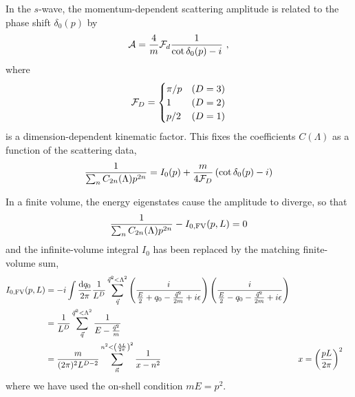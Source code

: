 In the $s$-wave, the momentum-dependent scattering amplitude is related to the phase shift $\delta_0(p)$ by
\begin{equation}
    \mathcal{A} = \frac{4}{m}\mathcal{F}_d\frac{1}{\cot \delta_0(p)-i}\ ,
\end{equation}
where
\begin{equation}
    \mathcal{F}_D
    =
    \begin{cases}
        \pi/p   & (D=3)\\
        1       & (D=2)\\
        p/2     & (D=1)
\end{cases}
\end{equation}
is a dimension-dependent kinematic factor.
This fixes the coefficients $C(\Lambda)$ as a function of the scattering data,
\begin{equation}
    \frac{1}{\sum_n C_{2n}(\Lambda) p^{2n}}
    =
    I_0(p) + \frac{m}{4 \mathcal{F}_D}\left(\cot \delta_0(p) - i\right)
\end{equation}

In a finite volume, the energy eigenstates cause the amplitude to diverge, so that
\begin{equation}
    \frac{1}{\sum_n C_{2n}(\Lambda) p^{2n}} - I_{0,\textrm{FV}}(p,L) = 0
\end{equation}
and the infinite-volume integral $I_0$ has been replaced by the matching finite-volume sum,
\begin{align}
I_{0,\textrm{FV}}(p,L)
    &=-i\int \frac { \mathrm {d}q_0}{2\pi} \frac{1}{L^D}\sum_{\vec{q}}^{\vec{q}^2 < \Lambda^2} \left( \frac { i } { \frac{E}{2} + q _ { 0 } - \frac{\vec{q}^2}{2m} + i \epsilon } \right) \left( \frac { i } { \frac{E}{2} - q _ { 0 } - \frac{\vec{q}^2}{2m} + i \epsilon } \right)
    \\
    &=\frac{1}{L^D}\sum_{\vec{q}}^{\vec{q}^2 < \Lambda^2} \frac { 1 } { E - \frac{\vec{q}^2}{m} }
    \\
    &=\frac{m}{(2\pi)^2 L^{D-2}} \sum_{\vec{n}}^{n^2 < \left(\frac{\Lambda L}{2\pi}\right)^2} \frac{1}{x-n^2}
    &
    x &= \left( \frac{pL}{2\pi}\right)^2
\end{align}
where we have used the on-shell condition $mE=p^2$.

